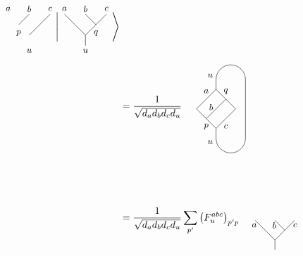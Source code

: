 \begin{rem}
\begin{align}
\begin{tikzpicture}[baseline=(current bounding box.center),yscale=0.75,xscale=0.75]
				\draw (-0.5,1.5) -- (0,2);
				\draw (0,1) -- (0.5,1.5);
				\draw (0.5,1.5) -- (1,2);
				\node at (0,0.25) {\small $u$};
				\node at (-1,2.25) {\small $a$};
				\node at (0,2.25) {\small $b$};
				\node at (1,2.25) {\small $c$};
				\node at (-0.5,1.1) {\small $p$};
			\end{tikzpicture}
			\Bigg|
			\begin{tikzpicture}[baseline=(current bounding box.center),yscale=0.75,xscale=0.75]
				\draw (0,0.5) -- (0,1);
				\draw (0,1) -- (-0.5,1.5);
				\draw (-0.5,1.5) -- (-1,2);
				\draw (0.5,1.5) -- (0,2);
				\draw (0,1) -- (0.5,1.5);
				\draw (0.5,1.5) -- (1,2);
				\node at (0,0.25) {\small $u$};
				\node at (-1,2.25) {\small $a$};
				\node at (0,2.25) {\small $b$};
				\node at (1,2.25) {\small $c$};
				\node at (0.5,1.1) {\small $q$};
			\end{tikzpicture}
			\Bigg\rangle\\
			&=\frac{1}{\sqrt{d_a d_b d_c d_u}}
			\begin{tikzpicture}[baseline=(j.base),scale=0.7]
				\clip(-1.75,-1) rectangle (2,4.5);
				\draw (0,0.5) -- (0,1);
				\draw (0,1) -- (-0.5,1.5);
				\coordinate (j) at (-1,2);
				\draw (-0.5,1.5) -- (j);
				\draw (-0.5,1.5) -- node[above] {\small $b$} (0,2);
				\draw (0,1) -- (0.5,1.5);
				\draw (0.5,1.5) -- (1,2);
				\node at (-0.5,1.1) {\small $p$};
				\node at (0.5,1.1) {\small $c$};
				\draw (0,0.5) arc (-180:0:0.75cm);
				\rotatebox[]{180}{
					\begin{scope}[yshift=-4cm]
					\draw (0,0.5) -- (0,1);
					\draw (0,1) -- (-0.5,1.5);
					\draw (-0.5,1.5) -- (-1,2);
					\draw (-0.5,1.5) -- (0,2);
					\draw (0,1) -- (0.5,1.5);
					\draw (0.5,1.5) -- (1,2);
					\node at (-0.5,1.1) {\rotatebox[]{180}{\small $q$}};
					\node at (0.5,1.1) {\rotatebox[]{180}{\small $a$}};
					\draw (0,0.5) arc (0:-180:0.75cm);
					\end{scope}
				}
				\draw (1.5,0.5) -- (1.5,3.5);
				\node at (-0.3,0.3) {\small $u$};
				\node at (-0.3,3.7) {\small $u$};
			\end{tikzpicture}\\
			&=\frac{1}{\sqrt{d_a d_b d_c d_u}}\sum_{p'}\left(F_u^{abc}\right)_{p'p}
			\begin{tikzpicture}[baseline=(j.base),scale=0.7]
				\clip(-1.75,-1) rectangle (2,4.5);
				\draw (0,0.5) -- (0,1);
				\draw (0,1) -- (-0.5,1.5);
				\draw (-0.5,1.5) -- node[left] {\small $a$} (-1,2);
				\draw (0.5,1.5) -- node[left] {\small $b$} (0,2);
				\draw (0,1) -- (0.5,1.5);
				\draw (0.5,1.5) -- node[right] {\small $c$} (1,2);

\end{tikzpicture}
\end{align}
\end{rem}
